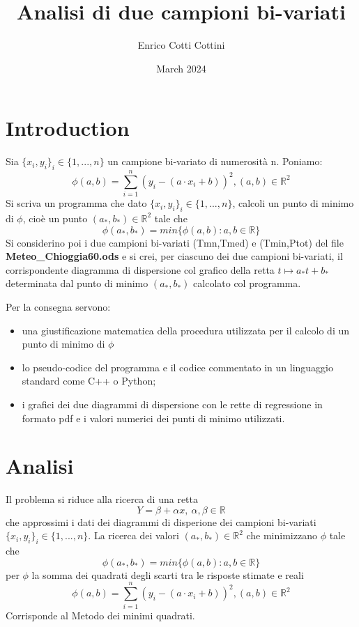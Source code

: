 \documentclass{article}
\title{Analisi di due campioni bi-variati}
\author{Enrico Cotti Cottini}
\date{March 2024}
\begin{document}
\maketitle

\section{Introduction}

Sia $\{x_i , y_i\}_i\in\{1,...,n\}$ un campione bi-variato di numerosità n.
\newline
Poniamo:
\[
    \phi(a,b)=\sum_{i=1}^{n}(y_i-(a\cdot x_i+b))^2 , (a,b)\in \mathbb{R}^2
\]
Si scriva un programma che dato $\{x_i , y_i\}_i\in\{1,...,n\}$, calcoli un punto di minimo di $\phi$, cioè un punto $(a_*,b_*)\in \mathbb{R}^2$ tale che
\[
    \phi (a_*,b_*)=min\{\phi(a,b):a,b\in\mathbb{R}\}
\]
Si considerino poi i due campioni bi-variati (Tmn,Tmed) e (Tmin,Ptot) del file \textbf{Meteo\_Chioggia60.ods} e si crei, per ciascuno dei due campioni bi-variati, il corrispondente diagramma di dispersione col grafico della retta $t \mapsto a_* t+b_*$ determinata dal punto di minimo $(a_*,b_*)$ calcolato col programma.

Per la consegna servono:
\begin{itemize}
\item una giustificazione matematica della procedura utilizzata per il calcolo di un punto di minimo di $\phi$
\item lo pseudo-codice del programma e il codice commentato in un linguaggio
standard come C++ o Python;
\item i grafici dei due diagrammi di dispersione con le rette di regressione in
formato pdf e i valori numerici dei punti di minimo utilizzati.
\end{itemize}


\section{Analisi}
Il problema si riduce alla ricerca di una retta
\[
    Y = \beta + \alpha x,\ \alpha,\beta \in\mathbb{R}
\]
che approssimi i dati dei diagrammi di disperione dei campioni bi-variati $\{x_i , y_i\}_i\in\{1,...,n\}$.
\newline
La ricerca dei valori $(a_*,b_*)\in \mathbb{R}^2$ che minimizzano $\phi$ tale che
\[
    \phi (a_*,b_*)=min\{\phi(a,b):a,b\in\mathbb{R}\}
\]
per $ \phi$ la somma dei quadrati degli scarti tra le risposte stimate e reali 
\[
    \phi(a,b)=\sum_{i=1}^{n}(y_i-(a\cdot x_i+b))^2 , (a,b)\in \mathbb{R}^2
\]
Corrisponde al Metodo dei minimi quadrati.
\end{document}
